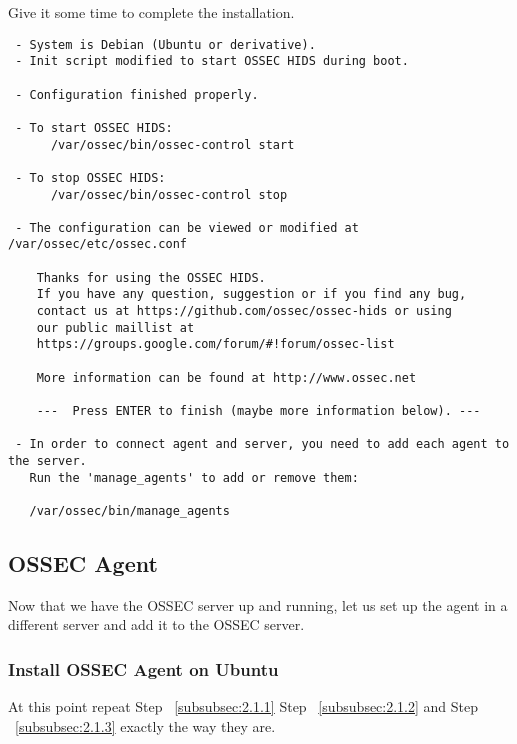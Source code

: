 \documentclass{article}
\begin{document}
Give it some time to complete the installation.
\begin{verbatim}
 - System is Debian (Ubuntu or derivative).
 - Init script modified to start OSSEC HIDS during boot.

 - Configuration finished properly.

 - To start OSSEC HIDS:
      /var/ossec/bin/ossec-control start

 - To stop OSSEC HIDS:
      /var/ossec/bin/ossec-control stop

 - The configuration can be viewed or modified at /var/ossec/etc/ossec.conf

    Thanks for using the OSSEC HIDS.
    If you have any question, suggestion or if you find any bug,
    contact us at https://github.com/ossec/ossec-hids or using
    our public maillist at
    https://groups.google.com/forum/#!forum/ossec-list

    More information can be found at http://www.ossec.net

    ---  Press ENTER to finish (maybe more information below). ---

 - In order to connect agent and server, you need to add each agent to the server.
   Run the 'manage_agents' to add or remove them:

   /var/ossec/bin/manage_agents
\end{verbatim}
\subsection{OSSEC Agent}
Now that we have the OSSEC server up and running, let us set up the agent in a different server and add it to the OSSEC server.
\subsubsection{Install OSSEC Agent on Ubuntu}
At this point repeat Step ~\ref{subsubsec:2.1.1} Step ~\ref{subsubsec:2.1.2} and Step ~\ref{subsubsec:2.1.3} exactly the way they are.
\end{document}
